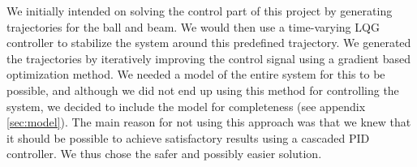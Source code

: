 We initially intended on solving the control part of this project by generating trajectories for the ball and beam.
We would then use a time-varying LQG controller to stabilize the system around this predefined trajectory.
We generated the trajectories by iteratively improving the control signal using a gradient based optimization method.
We needed a model of the entire system for this to be possible, and although we did not end up using this method for controlling the system, we decided to include the model for completeness (see appendix \ref{sec:model}).
The main reason for not using this approach was that we knew that it should be possible to achieve satisfactory results using a cascaded PID controller.
We thus chose the safer and possibly easier solution.
